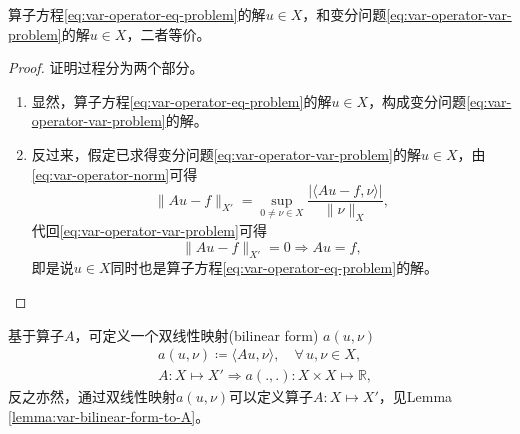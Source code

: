 \begin{theorem}
  \label{theorem:var-equivalance-solution-operator-var}
  算子方程\eqref{eq:var-operator-eq-problem}的解$u \in X$，和变分问题\eqref{eq:var-operator-var-problem}的解$u \in X$，二者等价。
\end{theorem}
\begin{proof}
  证明过程分为两个部分。
  \begin{enumerate}
    \item 显然，算子方程\eqref{eq:var-operator-eq-problem}的解$u \in X$，构成变分问题\eqref{eq:var-operator-var-problem}的解。

    \item 反过来，假定已求得变分问题\eqref{eq:var-operator-var-problem}的解$u \in X$，由\eqref{eq:var-operator-norm}可得
\begin{equation*}
  \big\| A u - f \big\| _{X'} = \sup_{0 \neq \nu \in X}
  \frac{
  \big| \langle Au - f, \nu \rangle \big|
  }{
  \big\| \nu \big\|_{X}
  },
\end{equation*}
代回\eqref{eq:var-operator-var-problem}可得
\begin{equation*}
  \big\| A u - f \big\| _{X'} = 0 \Rightarrow Au = f,
\end{equation*}
即是说$u \in X$同时也是算子方程\eqref{eq:var-operator-eq-problem}的解。
\end{enumerate}
\end{proof}

基于算子$A$，可定义一个双线性映射(bilinear form) $a(u,\nu)$
\begin{equation}
\label{var-bilinear-form}
  \begin{split}
      & a(u,\nu) \coloneqq \langle Au, \nu \rangle, \quad \forall \, u,\nu \in X, \\
      & A:X \mapsto X' \Rightarrow a(.,.):X \times X \mapsto \mathbb{R},
  \end{split}
\end{equation}
反之亦然，通过双线性映射$a(u,\nu)$可以定义算子$A:X \mapsto X'$，见Lemma \ref{lemma:var-bilinear-form-to-A}。

